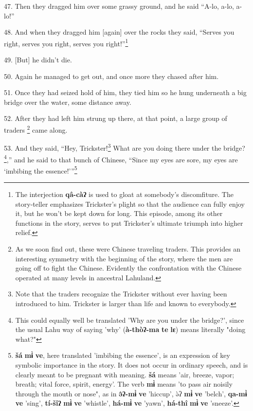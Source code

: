 47. Then they dragged him over some grassy ground, and he said ``A-lo, a-lo, a-lo!''

48. And when they dragged him [again] over the rocks they said, ``Serves you right,
serves you right, serves you right!''\footnote{The interjection \textbf{qâ-càʔ} is used to gloat at somebody's discomfiture. The story-teller emphasizes Trickster's plight so that the audience can fully enjoy it, but he won't be kept down for long. This episode, among its other functions in the story, serves to put Trickster's ultimate triumph into higher relief.}

49. [But] he didn't die.

50. Again he managed to get out, and once more they chased after him.

51. Once they had seized hold of him, they tied him so he hung underneath a big
bridge over the water, some distance away.

52. After they had left him strung up there, at that point, a large group of traders
\footnote{As we soon find out, these were Chinese traveling traders. This provides an interesting symmetry with the beginning of the story, where the men are going off to fight the Chinese. Evidently the confrontation with the Chinese operated at many levels in ancestral Lahuland.} came along.

53. And they said, ``Hey, Trickster!\footnote{Note that the traders recognize the Trickster without ever having been introduced to him. Trickster is larger than life and known to everybody.} What are you doing there under the bridge?
\footnote{This could equally well be translated 'Why are you under the bridge?', since the usual Lahu way of saying 'why' (\textbf{à-thòʔ-ma} \textbf{te} \textbf{lɛ}) means literally "doing what?"},'' and he said to that bunch of Chinese, ``Since my eyes are sore, my eyes
are `imbibing the essence!'''\footnote{\textbf{šá} \textbf{mɨ̀} \textbf{ve}, here translated 'imbibing the essence', is an expression of key symbolic importance in the story. It does not occur in ordinary speech, and is clearly meant to be pregnant with meaning. \textbf{šá} means 'air, breeze, vapor; breath; vital force, spirit, energy'. The verb \textbf{mɨ̀} means 'to pass air noisily through the mouth or nose", as in \textbf{ə̂ʔ-mɨ̀} \textbf{ve} 'hiccup', ə̀ʔ \textbf{mɨ̀} \textbf{ve} 'belch', \textbf{qa-mɨ̀} \textbf{ve} 'sing', \textbf{tí-šîʔ} \textbf{mɨ̀} \textbf{ve} 'whistle', \textbf{há-mɨ̀} \textbf{ve} 'yawn', \textbf{há-thî} \textbf{mɨ̀} \textbf{ve} 'sneeze'.}


